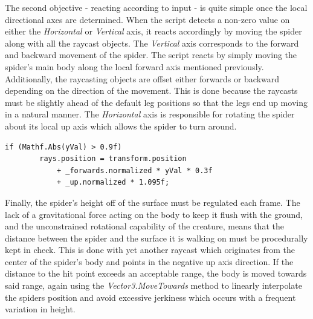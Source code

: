 The second objective - reacting according to input - is quite simple once the
local directional axes are determined. When the script detects a non-zero value
on either the \textit{Horizontal} or \textit{Vertical} axis, it reacts
accordingly by moving the spider along with all the raycast objects. The
\textit{Vertical} axis corresponds to the forward and backward movement of the
spider. The script reacts by simply moving the spider's main body along the
local forward axis mentioned previously. Additionally, the raycasting objects
are offset either forwards or backward depending on the direction of the
movement. This is done because the raycasts must be slightly ahead of the
default leg positions so that the legs end up moving in a natural manner.
The \textit{Horizontal} axis is responsible for rotating the spider about its
local up axis which allows the spider to turn around. 

\begin{lstlisting}[basicstyle=\footnotesize, numbers=none,frame=single,
caption={The raycasts which scan the terrain for leg placement positions are
offset in the direction in which the spider is walking. The \textit{yVal}
variable is the value of the \textit{Vertical} axis input},captionpos=b,
label=ray_offset, language={[Sharp]c}]
    if (Mathf.Abs(yVal) > 0.9f)
        rays.position = transform.position
            + _forwards.normalized * yVal * 0.3f
            + _up.normalized * 1.095f;
\end{lstlisting}

Finally, the spider's height off of the surface must be regulated each frame.
The lack of a gravitational force acting on the body to keep it flush with the
ground, and the unconstrained rotational capability of the creature, means that
the distance between the spider and the surface it is walking on must be
procedurally kept in check. This is done with yet another raycast which
originates from the center of the spider's body and points in the negative up
axis direction. If the distance to the hit point exceeds an acceptable range,
the body is moved towards said range, again using the
\textit{Vector3.MoveTowards} method to linearly interpolate the spiders position
and avoid excessive jerkiness which occurs with a frequent variation in height. 



